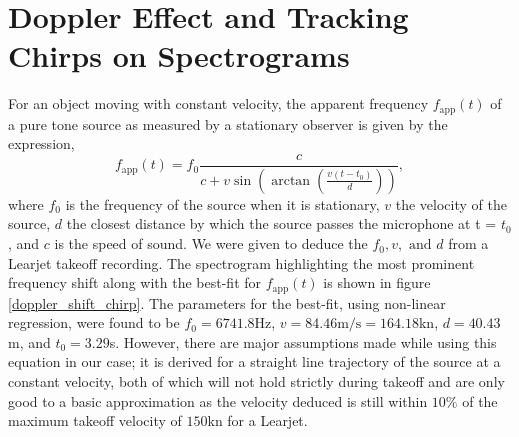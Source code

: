 \documentclass[10pt]{article}
\begin{document}
\section{Doppler Effect and Tracking Chirps on Spectrograms}
For an object moving with constant velocity, the apparent frequency $f_\text{app}(t)$ of a pure tone source as measured by a stationary observer is given by the expression,
\[
f_\text{app}(t) = f_0 \frac{c}{c + v\sin\left(\arctan\left(\frac{v(t-t_0)}{d}\right)\right)},
\]
where $f_0$ is the frequency of the source when it is stationary, $v$ the velocity of the source, $d$ the closest distance by which the source passes the microphone at t = $t_0$, and $c$ is the speed of sound. We were given to deduce the $f_0, v, \text{ and } d$ from a Learjet takeoff recording. The spectrogram highlighting the most prominent frequency shift along with the best-fit for $f_\text{app}(t)$ is shown in figure \ref{doppler_shift_chirp}. The parameters for the best-fit, using non-linear regression, were found to be $f_0 = 6741.8$Hz, $v = 84.46\text{m/s} = 164.18$kn, $d=40.43$m, and $t_0 = 3.29$s. However, there are major assumptions made while using this equation in our case; it is derived for a straight line trajectory of the source at a constant velocity, both of which will not hold strictly during takeoff and are only good to a basic approximation as the velocity deduced is still within $10\%$ of the maximum takeoff velocity of $150$kn for a Learjet.
\end{document}
